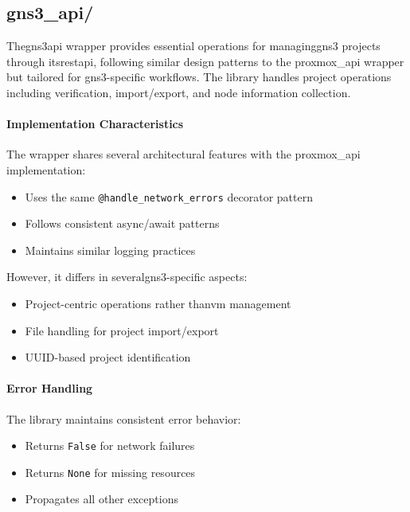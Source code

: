     \subsection{gns3\_api/}
        The\ac{gns3}\ac{api} wrapper provides essential operations for managing\ac{gns3} projects through 
        its\ac{rest}\ac{api}, following similar design patterns to the proxmox\_api wrapper but tailored for
        \ac{gns3}-specific workflows. The library handles project operations including verification, import/export, 
        and node information collection.

        \paragraph{Implementation Characteristics}

        The wrapper shares several architectural features with the proxmox\_api implementation:

        \begin{itemize}
        \item Uses the same \texttt{@handle\_network\_errors} decorator pattern
        \item Follows consistent async/await patterns
        \item Maintains similar logging practices
        \end{itemize}

        However, it differs in several\ac{gns3}-specific aspects:

        \begin{itemize}
        \item Project-centric operations rather than\ac{vm} management
        \item File handling for project import/export
        \item UUID-based project identification
        \end{itemize}

        \paragraph{Error Handling}

        The library maintains consistent error behavior:

        \begin{itemize}
        \item Returns \texttt{False} for network failures
        \item Returns \texttt{None} for missing resources
        \item Propagates all other exceptions
        \end{itemize}

